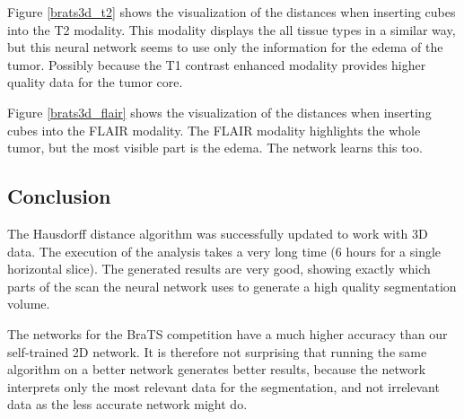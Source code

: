 Figure \ref{brats3d_t2} shows the visualization of the distances when inserting cubes into the T2 modality. This modality displays the all tissue types in a similar way, but this neural network seems to use only the information for the edema of the tumor. Possibly because the T1 contrast enhanced modality provides higher quality data for the tumor core.

Figure \ref{brats3d_flair} shows the visualization of the distances when inserting cubes into the FLAIR modality. The FLAIR modality highlights the whole tumor, but the most visible part is the edema. The network learns this too.

\subsection{Conclusion}
The Hausdorff distance algorithm was successfully updated to work with 3D data. The execution of the analysis takes a very long time (6 hours for a single horizontal slice). The generated results are very good, showing exactly which parts of the scan the neural network uses to generate a high quality segmentation volume.

The networks for the BraTS competition have a much higher accuracy than our self-trained 2D network. It is therefore not surprising that running the same algorithm on a better network generates better results, because the network interprets only the most relevant data for the segmentation, and not irrelevant data as the less accurate network might do.
